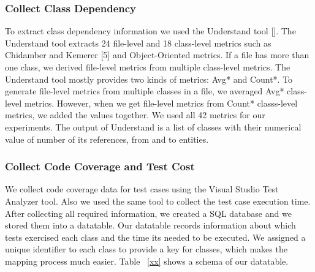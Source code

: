 \subsubsection{Collect Class Dependency}
To extract class dependency information 
we used the Understand tool []. The Understand tool
extracts 24 file-level and 18 class-level metrics 
such as Chidamber and Kemerer [5] and Object-Oriented metrics. If
a file has more than one class, we derived file-level
metrics from multiple class-level metrics. 
The Understand tool mostly provides two kinds of metrics: Avg* and Count*. 
To generate file-level metrics from multiple classes in a file, we
averaged Avg* class-level metrics. However, when we get
file-level metrics from Count* classs-level metrics, we added
the values together. We used all 42 metrics for our experiments.
The output of Understand is a list of classes with their numerical 
value of number of its references, from and to entities. \\

\subsubsection{Collect Code Coverage and Test Cost}

We collect code coverage data for test cases using the Visual Studio
Test Analyzer tool. Also we used the same tool to collect the 
test case execution time. After collecting all required information, 
we created a SQL database and we stored them into a datatable. 
Our datatable records information about which tests exercised each class
and the time its needed to be executed. 
We assigned a unique identifier to each class to provide
a key for classes, which makes the mapping process much easier.
Table ~\ref{xx} shows a schema of our datatable. 

  

